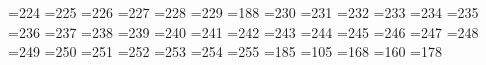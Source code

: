 =224 %
{}=225 %
{}=226 %
{}=227 %
{}=228 %
{}=229 %
{}=188 %
{}=230 %
{}=231 %
{}=232 %
{}=233 %
{}=234 %
{}=235 %
{}=236 %
{}=237 %
{}=238 %
{}=239 %
{}=240 %
{}=241 %
{}=242 %
{}=243 %
{}=244 %
{}=245 %
{}=246 %
{}=247 %
{}=248 %
{}=249 %
{}=250 %
{}=251 %
{}=252 %
{}=253 %
{}=254 %
{}=255 %
=185 %
{}=105 %
{}=168 %
{}=160 %
{}=178 %

